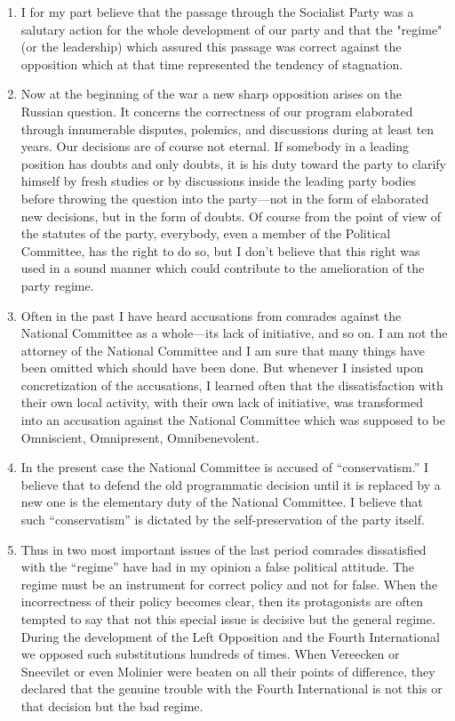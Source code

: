 \begin{enumerate}
  \item I for my part believe that the passage through the Socialist Party was a salutary action for the whole development of our party and that the "regime" (or the leadership) which assured this passage was correct against the opposition which at that time represented the tendency of stagnation.
	
  \item Now at the beginning of the war a new sharp opposition arises on the Russian question. It concerns the correctness of our program elaborated through innumerable disputes, polemics, and discussions during at least ten years. Our decisions are of course not eternal. If somebody in a leading position has doubts and only doubts, it is his duty toward the party to clarify himself by fresh studies or by discussions inside the leading party bodies before throwing the question into the party---not in the form of elaborated new decisions, but in the form of doubts. Of course from the point of view of the statutes of the party, everybody, even a member of the Political Committee, has the right to do so, but I don’t believe that this right was used in a sound manner which could contribute to the amelioration of the party regime.
	
  \item Often in the past I have heard accusations from comrades against the National Committee as a whole---its lack of initiative, and so on. I am not the attorney of the National Committee and I am sure that many things have been omitted which should have been done. But whenever I insisted upon concretization of the accusations, I learned often that the dissatisfaction with their own local activity, with their own lack of initiative, was transformed into an accusation against the National Committee which was supposed to be Omniscient, Omnipresent, Omnibenevolent.
	
  \item In the present case the National Committee is accused of “conservatism.” I believe that to defend the old programmatic decision until it is replaced by a new one is the elementary duty of the National Committee. I believe that such “conservatism” is dictated by the self-preservation of the party itself.
	
  \item Thus in two most important issues of the last period comrades dissatisfied with the “regime” have had in my opinion a false political attitude. The regime must be an instrument for correct policy and not for false. When the incorrectness of their policy becomes clear, then its protagonists are often tempted to say that not this special issue is decisive but the general regime. During the development of the Left Opposition and the Fourth International we opposed such substitutions hundreds of times. When Vereecken or Sneevilet or even Molinier were beaten on all their points of difference, they declared that the genuine trouble with the Fourth International is not this or that decision but the bad regime.
	

\end{enumerate}
